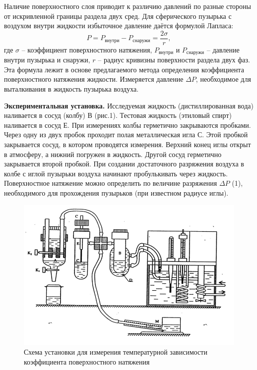 \documentclass[a4paper,12pt]{article} %
\theoremstyle{plain} %
\theoremstyle{definition} %
\theoremstyle{remark} %
\begin{document}
Наличие поверхностного слоя приводит к различию давлений по разные стороны от искривленной границы раздела двух сред.  Для сферического пузырька с воздухом  внутри жидкости избыточное давление даётся формулой Лапласа:
\begin{equation}
P = P_{\text{внутри}} - P_{\text{снаружи}} =  \dfrac{2\sigma }{r} ,
\end{equation}
где $\sigma$ – коэффициент поверхностного натяжения, $P_{\text{внутри}}$ и $P_{\text{снаружи}}$ – давление внутри пузырька и снаружи, $r$ – радиус кривизны поверхности раздела двух фаз. Эта формула лежит в основе предлагаемого метода определения коэффициента поверхностного натяжения жидкости. Измеряется давление $\Delta P$, необходимое для выталкивания в жидкость пузырька воздуха.

\textbf{Экспериментальная установка.} Исследуемая жидкость (дистиллированная вода) наливается в сосуд (колбу) В (рис.1). Тестовая жидкость  (этиловый спирт) наливается  в сосуд Е.  При измерениях  колбы герметично закрываются  пробками.   Через одну из двух пробок  проходит полая металлическая игла С. Этой пробкой закрывается сосуд, в котором  проводятся измерения. Верхний конец иглы открыт в атмосферу, а нижний погружен в жидкость. Другой сосуд герметично закрывается второй пробкой. При создании достаточного  разряжения воздуха в колбе с иглой пузырьки воздуха начинают пробулькивать через жидкость. Поверхностное натяжение можно определить по величине разряжения $\Delta P$ (1), необходимого для прохождения пузырьков (при известном радиусе иглы).

\begin{figure}[H]
	\begin{center}
	 	\includegraphics[scale=0.8]{Pic_1}
 		\caption{Схема установки для измерения температурной зависимости коэффициента поверхностного натяжения}
	\end{center}
\end{figure}
\end{document}

